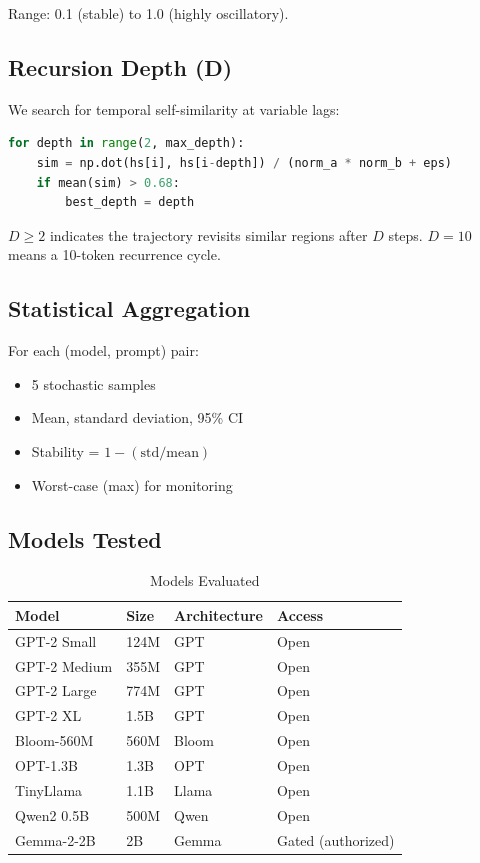 \documentclass[12pt,a4paper]{article}
\begin{document}
Range: 0.1 (stable) to 1.0 (highly oscillatory).

\subsection{Recursion Depth (D)}

We search for temporal self-similarity at variable lags:

\begin{lstlisting}[language=Python, caption=Recursion Depth Detection]
for depth in range(2, max_depth):
    sim = np.dot(hs[i], hs[i-depth]) / (norm_a * norm_b + eps)
    if mean(sim) > 0.68:
        best_depth = depth
\end{lstlisting}

$D \geq 2$ indicates the trajectory revisits similar regions after $D$ steps. $D = 10$ means a 10-token recurrence cycle.

\subsection{Statistical Aggregation}

For each (model, prompt) pair:
\begin{itemize}[noitemsep]
    \item 5 stochastic samples
    \item Mean, standard deviation, 95\% CI
    \item Stability = $1 - (\text{std} / \text{mean})$
    \item Worst-case (max) for monitoring
\end{itemize}

\subsection{Models Tested}

\begin{table}[h]
\centering
\caption{Models Evaluated}
\begin{tabular}{llll}
\toprule
\textbf{Model} & \textbf{Size} & \textbf{Architecture} & \textbf{Access} \\
\midrule
GPT-2 Small & 124M & GPT & Open \\
GPT-2 Medium & 355M & GPT & Open \\
GPT-2 Large & 774M & GPT & Open \\
GPT-2 XL & 1.5B & GPT & Open \\
Bloom-560M & 560M & Bloom & Open \\
OPT-1.3B & 1.3B & OPT & Open \\
TinyLlama & 1.1B & Llama & Open \\
Qwen2 0.5B & 500M & Qwen & Open \\
Gemma-2-2B & 2B & Gemma & Gated (authorized) \\
\bottomrule
\end{tabular}
\end{table}
\end{document}
